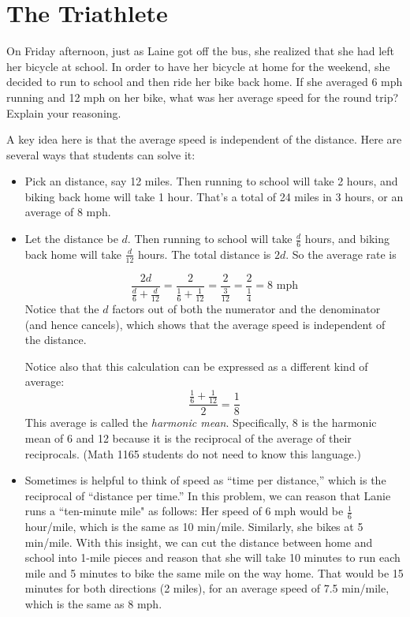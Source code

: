 \newpage
\section{The Triathlete}\label{A:Triathlete}

\begin{prob} 
On Friday afternoon, just as Laine got off the bus, she realized that she had left her bicycle at school.  In order to have her bicycle at home for the weekend, she decided to run to school and then ride her bike back home.  If she averaged 6 mph running and 12 mph on her bike, what was her average speed for the round trip?  Explain your reasoning. 
\end{prob}

\begin{teachingnote}
A key idea here is that the average speed is independent of the distance.  Here are several ways that students can solve it: 
\begin{itemize}
\item Pick an distance, say 12 miles.  Then running to school will take 2 hours, and biking back home will take 1 hour.  That's a total of 24 miles in 3 hours, or an average of 8 mph.  
\item Let the distance be $d$.  Then running to school will take $\frac{d}{6}$ hours, and biking back home will take $\frac{d}{12}$ hours.  The total distance is $2d$.  So the average rate is 

$$\frac{2d}{\frac{d}{6}+\frac{d}{12}}=\frac{2}{\frac{1}{6}+\frac{1}{12}}=\frac{2}{\frac{3}{12}}=\frac{2}{\frac{1}{4}}=8 \text{ mph}$$
Notice that the $d$ factors out of both the numerator and the denominator (and hence cancels), which shows that the average speed is independent of the distance.  

Notice also that this calculation can be expressed as a different kind of average:  $$\frac{\frac{1}{6}+\frac{1}{12}}{2}=\frac{1}{8}$$
This average is called the \emph{harmonic mean}.  Specifically, 8 is the harmonic mean of 6 and 12 because it is the reciprocal of the average of their reciprocals.  (Math 1165 students do not need to know this language.)
\item Sometimes is helpful to think of speed as ``time per distance,'' which is the reciprocal of ``distance per time.''  In this problem, we can reason that Lanie runs a ``ten-minute mile" as follows:  Her speed of 6 mph would be $\frac{1}{6}$ hour/mile, which is the same as 10 min/mile.  Similarly, she bikes at 5 min/mile.  With this insight, we can cut the distance between home and school into 1-mile pieces and reason that she will take 10 minutes to run each mile and 5 minutes to bike the same mile on the way home.  That would be 15 minutes for both directions (2 miles), for an average speed of 7.5 min/mile, which is the same as 8 mph.  
\end{itemize}
\end{teachingnote}

